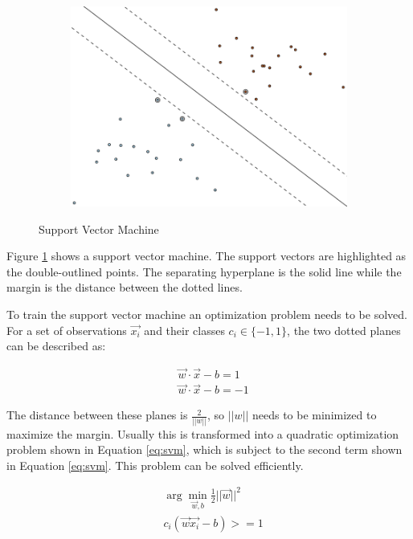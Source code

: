 \documentclass[pdftex,12pt,a4paper]{report}
\begin{document}
\begin{figure}[h]
	\centering
	\begin{subfigure}[b]{0.65\textwidth}
		\centering
		\includegraphics[width=.9\linewidth]{img/basics/svm.png}
	\end{subfigure}
	\caption{Support Vector Machine}
	\label{fig:basics-svm}
\end{figure}

Figure \ref{fig:basics-svm} shows a support vector machine. The support vectors are highlighted as the double-outlined points. The separating hyperplane is the solid line while the margin is the distance between the dotted lines.

To train the support vector machine an optimization problem needs to be solved. For a set of observations $\vec{x_i}$ and their classes $c_i \in \{ -1, 1 \}$, the two dotted planes can be described as:

\begin{equation}
\begin{split}
	& \vec{w} \cdot \vec{x} - b = 1 \\
	& \vec{w} \cdot \vec{x} - b = -1
\end{split}
\end{equation}

The distance between these planes is $\frac{2}{||w||}$, so $||w||$ needs to be minimized to maximize the margin. Usually this is transformed into a quadratic optimization problem shown in Equation \ref{eq:svm}, which is subject to the second term shown in Equation \ref{eq:svm}. This problem can be solved efficiently.

\begin{equation}
\label{eq:svm}
\begin{split}
& \arg\min_{\vec{w}, b} \frac{1}{2} ||\vec{w}||^2 \\
& c_i (\vec{w} \vec{x_i} - b) >= 1
\end{split}
\end{equation}
\end{document}
